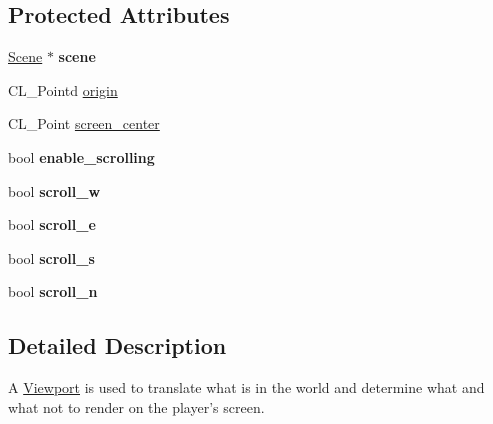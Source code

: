 \subsection*{Protected Attributes}
\begin{DoxyCompactItemize}
\item 
\hypertarget{classViewport_aae7f2e237993219df23f773ea8999e06}{
\hyperlink{classScene}{Scene} $\ast$ {\bfseries scene}}
\label{classViewport_aae7f2e237993219df23f773ea8999e06}

\item 
CL\_\-Pointd \hyperlink{classViewport_ac1415e2e5f8ccad7e50dc834126439fa}{origin}
\item 
CL\_\-Point \hyperlink{classViewport_ada6d3facef528063b5204a530f8b30bf}{screen\_\-center}
\item 
\hypertarget{classViewport_a42ba88c36a7316d6db37928c85e9808b}{
bool {\bfseries enable\_\-scrolling}}
\label{classViewport_a42ba88c36a7316d6db37928c85e9808b}

\item 
\hypertarget{classViewport_a8a2876659e5d991dd6c932da04bca824}{
bool {\bfseries scroll\_\-w}}
\label{classViewport_a8a2876659e5d991dd6c932da04bca824}

\item 
\hypertarget{classViewport_a2b873a4def8f03ea0848f5ab7be7a504}{
bool {\bfseries scroll\_\-e}}
\label{classViewport_a2b873a4def8f03ea0848f5ab7be7a504}

\item 
\hypertarget{classViewport_ac6d9ba653f13df11c98482356ac50fb5}{
bool {\bfseries scroll\_\-s}}
\label{classViewport_ac6d9ba653f13df11c98482356ac50fb5}

\item 
\hypertarget{classViewport_a36b4488652be753759b3aea0bfd47c52}{
bool {\bfseries scroll\_\-n}}
\label{classViewport_a36b4488652be753759b3aea0bfd47c52}

\end{DoxyCompactItemize}


\subsection{Detailed Description}
A \hyperlink{classViewport}{Viewport} is used to translate what is in the world and determine what and what not to render on the player's screen. 

